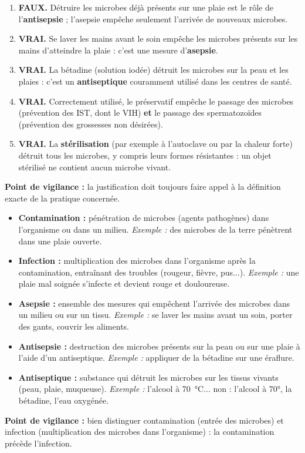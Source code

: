 \documentclass[11pt]{article}
\begin{document}
\begin{corrige}
\begin{enumerate}
\item \textbf{FAUX.} Détruire les microbes déjà présents sur une plaie est le rôle de l'\textbf{antisepsie} ; l'asepsie empêche seulement l'arrivée de nouveaux microbes.
\item \textbf{VRAI.} Se laver les mains avant le soin empêche les microbes présents sur les mains d'atteindre la plaie : c'est une mesure d'\textbf{asepsie}.
\item \textbf{VRAI.} La bétadine (solution iodée) détruit les microbes sur la peau et les plaies : c'est un \textbf{antiseptique} couramment utilisé dans les centres de santé.
\item \textbf{VRAI.} Correctement utilisé, le préservatif empêche le passage des microbes (prévention des IST, dont le VIH) \textbf{et} le passage des spermatozoïdes (prévention des grossesses non désirées).
\item \textbf{VRAI.} La \textbf{stérilisation} (par exemple à l'autoclave ou par la chaleur forte) détruit tous les microbes, y compris leurs formes résistantes : un objet stérilisé ne contient aucun microbe vivant.
\end{enumerate}
\textbf{Point de vigilance :} la justification doit toujours faire appel à la définition exacte de la pratique concernée.
\end{corrige}

\begin{corrige}
\begin{itemize}
\item \textbf{Contamination :} pénétration de microbes (agents pathogènes) dans l'organisme ou dans un milieu. \emph{Exemple :} des microbes de la terre pénètrent dans une plaie ouverte.
\item \textbf{Infection :} multiplication des microbes dans l'organisme après la contamination, entraînant des troubles (rougeur, fièvre, pus...). \emph{Exemple :} une plaie mal soignée s'infecte et devient rouge et douloureuse.
\item \textbf{Asepsie :} ensemble des mesures qui empêchent l'arrivée des microbes dans un milieu ou sur un tissu. \emph{Exemple :} se laver les mains avant un soin, porter des gants, couvrir les aliments.
\item \textbf{Antisepsie :} destruction des microbes présents sur la peau ou sur une plaie à l'aide d'un antiseptique. \emph{Exemple :} appliquer de la bétadine sur une éraflure.
\item \textbf{Antiseptique :} substance qui détruit les microbes sur les tissus vivants (peau, plaie, muqueuse). \emph{Exemple :} l'alcool à \SI{70}{\celsius}... non : l'alcool à 70°, la bétadine, l'eau oxygénée.
\end{itemize}
\textbf{Point de vigilance :} bien distinguer contamination (entrée des microbes) et infection (multiplication des microbes dans l'organisme) : la contamination précède l'infection.
\end{corrige}
\end{document}
